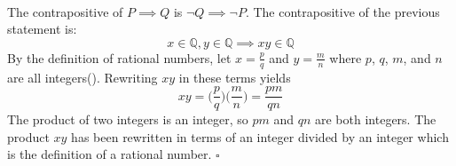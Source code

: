 \documentclass[11pt]{article}
\begin{document}
\paragraph{}
The contrapositive of $P \implies Q$ is $\neg Q \implies \neg P$.
The contrapositive of the previous statement is:
\begin{equation}
	x \in \mathbb{Q}, y \in \mathbb{Q} \implies xy \in \mathbb{Q}
\end{equation}
By the definition of rational numbers, let $x=\frac{p}{q}$ and $y=\frac{m}{n}$ where $p$, $q$, $m$, and $n$ are all integers(\cite{tbb}).
Rewriting $xy$ in these terms yields
\begin{equation}
	xy=\bigg(\frac{p}{q}\bigg)\bigg(\frac{m}{n}\bigg)=\frac{pm}{qn}
\end{equation}
The product of two integers is an integer, so $pm$ and $qn$ are both integers.
The product $xy$ has been rewritten in terms of an integer divided by an integer which is the definition of a rational number.
$\square$

\printbibliography
\end{document}
